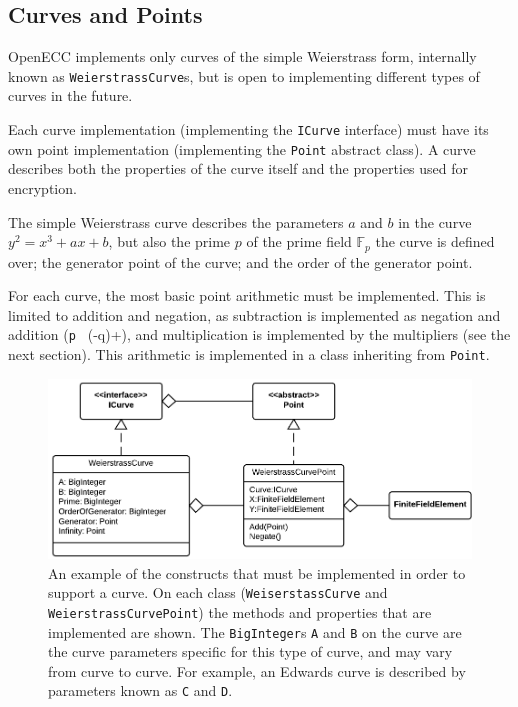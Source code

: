 \subsection{Curves and Points}
\label{sec:implementation_curves}

OpenECC implements only curves of the simple Weierstrass form, internally known as \verb+WeierstrassCurve+s,
but is open to implementing different types of curves in the future.

Each curve implementation (implementing the \verb+ICurve+ interface) must have its own point implementation
(implementing the \verb+Point+ abstract class). A curve describes both the properties of the curve itself and
the properties used for encryption.

The simple Weierstrass curve describes the parameters \(a\) and \(b\) in the curve \(y^2 = x^3 + ax + b\), but
also the prime \(p\) of the prime field \(\mathbb{F}_p\) the curve is defined over; the generator point of the
curve; and the order of the generator point.

For each curve, the most basic point arithmetic must be implemented. This is limited to addition and negation, as
subtraction is implemented as negation and addition (\verb+p + (-q)+), and multiplication is implemented by the
multipliers (see the next section). This arithmetic is implemented in a class inheriting from \verb+Point+.

\begin{figure}[htb]
	\centering
	\includegraphics[width=1\textwidth]{implementation/curves}
	\caption{An example of the constructs that must be implemented in order to support a curve. On each class
		(\texttt{WeiserstassCurve} and \texttt{WeierstrassCurvePoint}) the methods and properties
		that are implemented are shown. The \texttt{BigInteger}s \texttt{A} and \texttt{B} on the curve are
		the curve parameters specific for this type of curve, and may vary from curve to curve. For example,
		an Edwards curve is described by parameters known as \texttt{C} and \texttt{D}.}
\end{figure}

